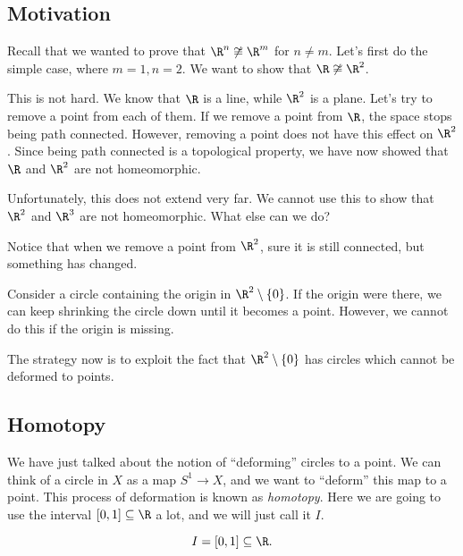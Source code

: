 \documentclass[a4paper]{article}
\begin{document}
\setcounter{subsection}{-1}
\subsection{Motivation}
Recall that we wanted to prove that $\R^n \not\cong \R^m$ for $n\not= m$. Let's first do the simple case, where $m = 1, n = 2$. We want to show that $\R\not\cong \R^2$.

This is not hard. We know that $\R$ is a line, while $\R^2$ is a plane. Let's try to remove a point from each of them. If we remove a point from $\R$, the space stops being path connected. However, removing a point does not have this effect on $\R^2$. Since being path connected is a topological property, we have now showed that $\R$ and $\R^2$ are not homeomorphic.

Unfortunately, this does not extend very far. We cannot use this to show that $\R^2$ and $\R^3$ are not homeomorphic. What else can we do?

Notice that when we remove a point from $\R^2$, sure it is still connected, but something has changed.

Consider a circle containing the origin in $\R^2 \setminus \{0\}$. If the origin were there, we can keep shrinking the circle down until it becomes a point. However, we cannot do this if the origin is missing.
\begin{center}
\end{center}
The strategy now is to exploit the fact that $\R^2 \setminus \{0\}$ has circles which cannot be deformed to points.

\subsection{Homotopy}
We have just talked about the notion of ``deforming'' circles to a point. We can think of a circle in $X$ as a map $S^1 \to X$, and we want to ``deform'' this map to a point. This process of deformation is known as \emph{homotopy}. Here we are going to use the interval $[0, 1]\subseteq \R $ a lot, and we will just call it $I$.
\begin{notation}
  \[
    I = [0, 1]\subseteq \R.
  \]
\end{notation}
\end{document}
